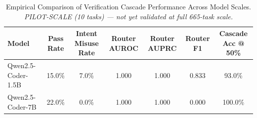 \begin{table}[htbp]
\centering
\caption{Empirical Comparison of Verification Cascade Performance Across Model Scales. \textit{PILOT-SCALE (10 tasks) — not yet validated at full 665-task scale.}}
\label{tab:model_comparison_pilot}
\begin{tabular}{lcccccc}
\toprule
\textbf{Model} & \textbf{Pass Rate} & \textbf{Intent Misuse Rate} & \textbf{Router AUROC} & \textbf{Router AUPRC} & \textbf{Router F1} & \textbf{Cascade Acc @ 50\%} \\
\midrule
Qwen2.5-Coder-1.5B & 15.0\% & 7.0\% & 1.000 & 1.000 & 0.833 & 93.0\% \\
Qwen2.5-Coder-7B   & 22.0\% & 0.0\% & 1.000 & 1.000 & 0.000 & 100.0\% \\
\bottomrule
\end{tabular}
\end{table}
